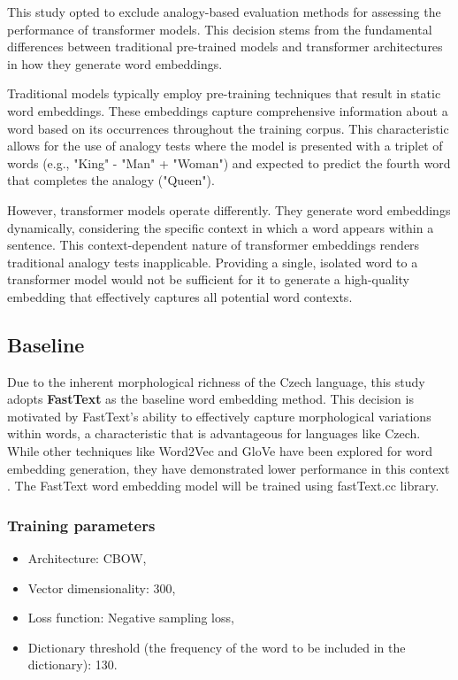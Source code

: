This study opted to exclude analogy-based evaluation methods for assessing the performance of transformer models.
This decision stems from the fundamental differences between traditional pre-trained models and transformer architectures in how they generate word embeddings.

Traditional models typically employ pre-training techniques that result in static word embeddings.
These embeddings capture comprehensive information about a word based on its occurrences throughout the training corpus.
This characteristic allows for the use of analogy tests where the model is presented with a triplet of words (e.g., "King" - "Man" + "Woman") and expected to predict the fourth word that completes the analogy ("Queen").

However, transformer models operate differently.
They generate word embeddings dynamically, considering the specific context in which a word appears within a sentence.
This context-dependent nature of transformer embeddings renders traditional analogy tests inapplicable.
Providing a single, isolated word to a transformer model would not be sufficient for it to generate a high-quality embedding that effectively captures all potential word contexts.

\subsection{Baseline}
Due to the inherent morphological richness of the Czech language, this study adopts \textbf{FastText} as the baseline word embedding method.
This decision is motivated by FastText's ability to effectively capture morphological variations within words, a characteristic that is advantageous for languages like Czech.
While other techniques like Word2Vec and \ac{GloVe} have been explored for word embedding generation, they have demonstrated lower performance in this context \cite{bojanowski2017enriching}.
The FastText word embedding model will be trained using fastText.cc library.

\subsubsection{Training parameters}
\begin{itemize}
  \item Architecture: \ac{CBOW},
  \item Vector dimensionality: 300,
  \item Loss function: Negative sampling loss,
  \item Dictionary threshold (the frequency of the word to be included in the dictionary): 130.
\end{itemize}

